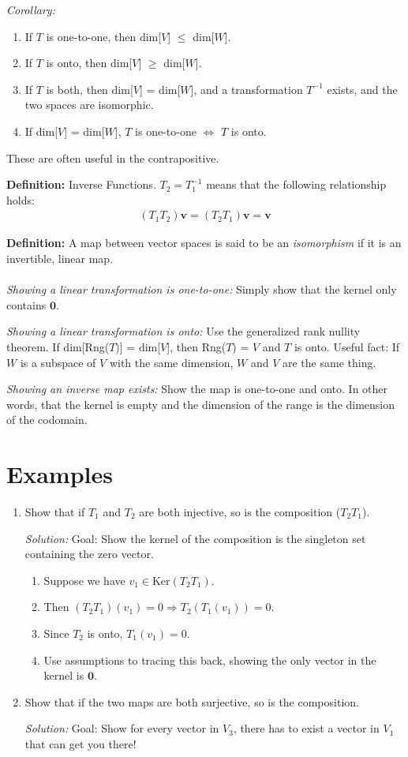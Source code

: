 \documentclass[a4paper,10pt]{report}
\newcommand{\vb}[1]{\mathbf{#1}}		%
\begin{document}
\textit{Corollary:}
\begin{enumerate}
	\item If $T$ is one-to-one, then dim[$V$] $\leq$ dim[$W$].
	\item If $T$ is onto, then dim[$V$] $\geq$ dim[$W$].
	\item If $T$ is both, then dim[$V$] = dim[$W$], and a transformation $T^{-1}$ exists, and the two spaces are isomorphic.
	\item If dim[$V$] = dim[$W$], $T$ is one-to-one $\iff$ $T$ is onto.
\end{enumerate}
These are often useful in the contrapositive.

\textbf{Definition: }Inverse Functions. $T_2 = T_1^{-1}$ means that the following relationship holds:
\begin{align*}
	(T_1T_2)\vb{v} = (T_2T_1)\vb{v} = \vb{v}
\end{align*}


\textbf{Definition:} A map between vector spaces is said to be an \textit{isomorphism} if it is an invertible, linear map. \\ \\

\textit{Showing a linear transformation is one-to-one: }Simply show that the kernel only contains $\vb{0}$.

\textit{Showing a linear transformation is onto: } Use the generalized rank nullity theorem. If dim[Rng($T$)] = dim[$V$], then Rng($T$) = $V$ and $T$ is onto. Useful fact: If $W$ is a subspace of $V$ with the same dimension, $W$ and $V$ are the same thing.

\textit{Showing an inverse map exists: } Show the map is one-to-one and onto. In other words, that the kernel is empty and the dimension of the range is the dimension of the codomain.

\section{Examples}
\begin{enumerate}
	\item Show that if $T_1$ and $T_2$ are both injective, so is the composition ($T_2T_1$).

	\textit{Solution: }
	Goal: Show the kernel of the composition is the singleton set containing the zero vector.
	\begin{enumerate}
		\item Suppose we have $v_1 \in \text{Ker}(T_2T_1).$
		\item Then $(T_2T_1)(v_1) = 0 \Rightarrow T_2(T_1(v_1)) = 0.$
		\item Since $T_2$ is onto, $T_1(v_1) = 0$.
		\item Use assumptions to tracing this back, showing the only vector in the kernel is $\vb{0}$.
	\end{enumerate}

	\item Show that if the two maps are both surjective, so is the composition.

	\textit{Solution: }
	Goal: Show for every vector in $V_3$, there has to exist a vector in $V_1$ that can get you there!
\end{enumerate}
\end{document}
